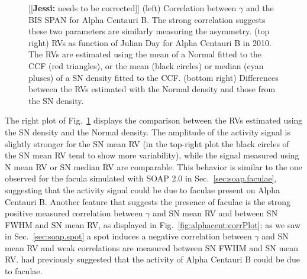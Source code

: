 \documentclass{aa}
\newcommand{\jessi}[1]{{\color{Purple}[[\textbf{Jessi: }#1]]}}
\begin{document}
\begin{figure}[htbp]
\begin{center}
   \caption{\jessi{needs to be corrected} (left) Correlation between $\gamma$ and the BIS SPAN for Alpha Centauri B. The strong correlation suggests these two parameters are similarly measuring the asymmetry. (top right) RVs as function of Julian Day for Alpha Centauri B in 2010. The RVs are estimated using the mean of a Normal fitted to the CCF (red triangles), or the mean (black circles) or median (cyan pluses) of a SN density fitted to the CCF. (bottom right) Differences between the RVs estimated with the Normal density and those from the SN density.}
   \label{fig:alphacent:corr.gamma}
\end{center}
\end{figure}
%

The right plot of Fig.~\ref{fig:alphacent:corr.gamma} displays the comparison between the RVs estimated using the SN density and the Normal density. 
The amplitude of the activity signal is slightly stronger for the SN mean RV (in the top-right plot the black circles of the SN mean RV tend to show more variability), while the signal measured using N mean RV or SN median RV are comparable. 
%
This behavior is similar to the one observed for the facula simulated with SOAP 2.0 in Sec.~\ref{sec:soap.faculae}, suggesting that the activity signal could be due to faculae present on Alpha Centauri B.  
%
Another feature that suggests the presence of faculae is the strong positive measured correlation between $\gamma$ and SN mean RV and  between SN FWHM and SN mean RV, as displayed in Fig.~\ref{fig:alphacent:corrPlot}; 
as we saw in Sec.~\ref{sec:soap.spot} a spot induces a negative correlation between $\gamma$ and SN mean RV and weak correlations are measured between SN FWHM and SN mean RV.
\citet{Dumusque-2014c} had previously suggested that the activity of Alpha Centauri B could be due to faculae.
%
\end{document}
